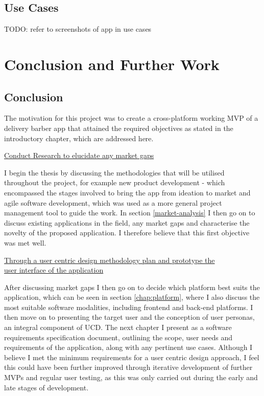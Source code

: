 \documentclass[12pt]{article}
\begin{document}
	\subsection{Use Cases}
	TODO: refer to screenshots of app in use cases
	
	\section{Conclusion and Further Work}
	\subsection{Conclusion}
	The motivation for this project was to create a cross-platform working MVP of a delivery barber app that attained the required objectives as stated in the introductory chapter, which are addressed here.
	\newline
	
	\noindent
	\underline{Conduct Research to elucidate any market gaps}
	\newline
	
	\noindent
	I begin the thesis by discussing the methodologies that will be utilised throughout the project, for example new product development - which encompassed the stages involved to bring the app from ideation to market and agile software development, which was used as a more general project management tool to guide the work. In section \ref{market-analysis} I then go on to discuss existing applications in the field, any market gaps and characterise the novelty of the proposed application. I therefore believe that this first objective was met well.
	\newline
	
	\noindent
	\underline{Through a user centric design methodology plan and prototype the}
	\\
	\underline{user interface of the application} 
	\newline
	
	\noindent
	After discussing market gaps I then go on to decide which platform best suits the application, which can be seen in section \ref{chap:platform}, where I also discuss the most suitable software modalities, including frontend and back-end platforms. I then move on to presenting the target user and the conception of user personas, an integral component of UCD. The next chapter I present as a software requirements specification document, outlining the scope, user needs and requirements of the application, along with any pertinent use cases. Although I believe I met the minimum requirements for a user centric design approach, I feel this could have been further improved through iterative development of further MVPs and regular user testing, as this was only carried out during the early and late stages of development.
	
\end{document}
